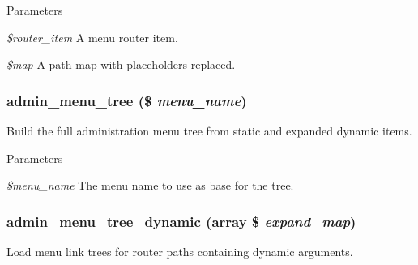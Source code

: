 \begin{DoxyParams}{Parameters}
\item[{\em \$router\_\-item}]A menu router item. \item[{\em \$map}]A path map with placeholders replaced. \end{DoxyParams}
\hypertarget{admin__menu_8inc_a7155f3b662374386ddc07f147074fcf1}{
\subsubsection[{admin\_\-menu\_\-tree}]{\setlength{\rightskip}{0pt plus 5cm}admin\_\-menu\_\-tree (\$ {\em menu\_\-name})}}
\label{admin__menu_8inc_a7155f3b662374386ddc07f147074fcf1}
Build the full administration menu tree from static and expanded dynamic items.


\begin{DoxyParams}{Parameters}
\item[{\em \$menu\_\-name}]The menu name to use as base for the tree. \end{DoxyParams}
\hypertarget{admin__menu_8inc_a84698cac1efd2078ef2763865995e226}{
\subsubsection[{admin\_\-menu\_\-tree\_\-dynamic}]{\setlength{\rightskip}{0pt plus 5cm}admin\_\-menu\_\-tree\_\-dynamic (array \$ {\em expand\_\-map})}}
\label{admin__menu_8inc_a84698cac1efd2078ef2763865995e226}
Load menu link trees for router paths containing dynamic arguments.


